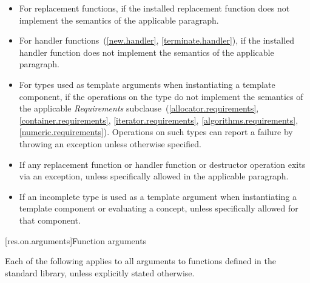 \begin{itemize}
\item
For replacement functions, if the installed replacement function does not
implement the semantics of the applicable
\required
paragraph.
\item
For handler functions~(\ref{new.handler}, \ref{terminate.handler}),
if the installed handler function does not implement the semantics of the applicable
\required
paragraph.
\item
For types used as template arguments when instantiating a template component,
if the operations on the type do not implement the semantics of the applicable
\emph{Requirements}
subclause~(\ref{allocator.requirements}, \ref{container.requirements}, \ref{iterator.requirements},
\ref{algorithms.requirements}, \ref{numeric.requirements}).
Operations on such types can report a failure by throwing an exception
unless otherwise specified.
\item
If any replacement function or handler function or destructor operation exits via an exception,
unless specifically allowed
in the applicable
\required
paragraph.
\item
If an incomplete type is used as a template
argument when instantiating a template component or evaluating a concept, unless specifically
allowed for that component.
\end{itemize}

[res.on.arguments]{Function arguments}

\pnum
{}%
%
Each of the following applies to all arguments
%
to functions defined in the \Cpp{} standard library,%
unless explicitly stated otherwise.

